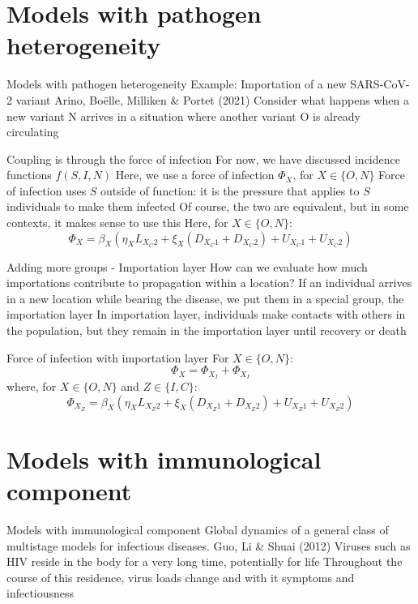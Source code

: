 \documentclass[aspectratio=169]{beamer}\usepackage[]{graphicx}\usepackage[]{xcolor}
\begin{document}

\section{Models with pathogen heterogeneity}
\begin{frame}{Models with pathogen heterogeneity}
\bbullet Example: Importation of a new SARS-CoV-2 variant
\bbullet Arino, Bo\"elle, Milliken \& Portet (2021)
\bbullet Consider what happens when a new variant N arrives in a situation where another variant O is already circulating
\end{frame}


\begin{frame}{Coupling is through the force of infection}
\bbullet For now, we have discussed incidence functions $f(S,I,N)$
\bbullet Here, we use a force of infection $\Phi_X$, for $X\in\{O,N\}$
\bbullet Force of infection uses $S$ outside of function: it is the pressure that applies to $S$ individuals to make them infected
\bbullet Of course, the two are equivalent, but in some contexts, it makes sense to use this
\bbullet Here, for $X\in\{O,N\}$:
\[
\Phi_X = \beta_X(\eta_{X}L_{X_C2}+\xi_X(D_{X_C1}+D_{X_C2})+U_{X_C1}+U_{X_C2})
\]
\end{frame}

\begin{frame}{Adding more groups - Importation layer}
\bbullet How can we evaluate how much importations contribute to propagation within a location?
\bbullet If an individual arrives in a new location while bearing the disease, we put them in a special group, the importation layer
\bbullet In importation layer, individuals make contacts with others in the population, but they remain in the importation layer until recovery or death
\end{frame}


\begin{frame}{Force of infection with importation layer}
For $X\in\{O,N\}$:
\[
\Phi_X = \Phi_{X_I}+\Phi_{X_I}
\]
where, for $X\in\{O,N\}$ and $Z\in\{I,C\}$:
\[
\Phi_{X_Z} = \beta_X(\eta_{X}L_{X_Z2}+\xi_X(D_{X_Z1}+D_{X_Z2})+U_{X_Z1}+U_{X_Z2})
\]
\end{frame}

\section{Models with immunological component}
\begin{frame}{Models with immunological component}
\bbullet Global dynamics of a general class of multistage models for infectious diseases. Guo, Li \& Shuai (2012)
\bbullet Viruses such as HIV reside in the body for a very long time, potentially for life
\bbullet Throughout the course of this residence, virus loads change and with it symptoms and infectiousness
\end{frame}
\end{document}

